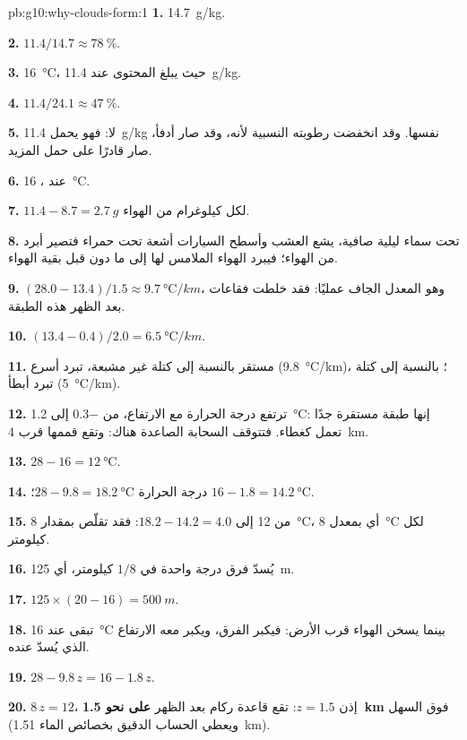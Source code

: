 \begin{solution}{pb:g10:why-clouds-form:1}
\textbf{1.} \qty{14.7}{g/kg}.

\textbf{2.} $11.4/14.7 \approx \qty{78}{\percent}$.

\textbf{3.} \qty{16}{\degreeCelsius}، حيث يبلغ المحتوى عند 
\qty{11.4}{g/kg}.

\textbf{4.} $11.4/24.1 \approx \qty{47}{\percent}$.

\textbf{5.} لا: فهو يحمل \qty{11.4}{g/kg} نفسها. وقد انخفضت رطوبته النسبية لأنه،
وقد صار أدفأ، صار قادرًا على حمل المزيد.

\textbf{6.} عند ، \qty{16}{\degreeCelsius}.

\textbf{7.} $11.4 - 8.7 = \qty{2.7}{g}$ لكل كيلوغرام من الهواء.

\textbf{8.} تحت سماء ليلية صافية، يشع العشب وأسطح السيارات أشعة تحت حمراء فتصير
أبرد من الهواء؛ فيبرد الهواء الملامس لها إلى ما دون  قبل بقية
الهواء.

\textbf{9.} $(28.0 - 13.4)/1.5 \approx \qty{9.7}{\degreeCelsius/km}$،
وهو المعدل الجاف عمليًا: فقد خلطت فقاعات بعد الظهر هذه الطبقة.

\textbf{10.} $(13.4 - 0.4)/2.0 = \qty{6.5}{\degreeCelsius/km}$.

\textbf{11.} مستقر بالنسبة إلى كتلة غير مشبعة، تبرد أسرع
(\qty{9.8}{\degreeCelsius/km})؛  بالنسبة إلى كتلة ، تبرد
أبطأ (\qty{5}{\degreeCelsius/km}).

\textbf{12.} ترتفع درجة الحرارة مع الارتفاع، من \num{-0.3} إلى
\qty{1.2}{\degreeCelsius}: إنها طبقة مستقرة جدًا تعمل كغطاء. فتتوقف السحابة
الصاعدة هناك: وتقع قممها قرب \qty{4}{km}.

\textbf{13.} $28 - 16 = \qty{12}{\degreeCelsius}$.

\textbf{14.} درجة الحرارة $28 - 9.8 = \qty{18.2}{\degreeCelsius}$؛ 
$16 - 1.8 = \qty{14.2}{\degreeCelsius}$.

\textbf{15.} من 12 إلى $18.2 - 14.2 = 4.0$: فقد تقلّص بمقدار
\qty{8}{\degreeCelsius}، أي بمعدل \qty{8}{\degreeCelsius} لكل كيلومتر.

\textbf{16.} يُسدّ فرق درجة واحدة في $1/8$ كيلومتر، أي
\qty{125}{m}.

\textbf{17.} $125 \times (20 - 16) = \qty{500}{m}$.

\textbf{18.} تبقى  عند \qty{16}{\degreeCelsius} بينما يسخن الهواء قرب
الأرض: فيكبر الفرق، ويكبر معه الارتفاع الذي يُسدّ عنده.

\textbf{19.} $28 - 9.8\,z = 16 - 1.8\,z$.

\textbf{20.} $8\,z = 12$، إذن $z = 1.5$: تقع قاعدة ركام بعد الظهر
\textbf{على نحو \qty{1.5}{km}} فوق السهل (ويعطي الحساب الدقيق بخصائص الماء
\qty{1.51}{km}).
\end{solution}
